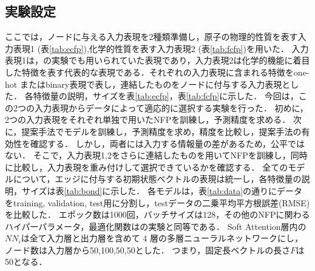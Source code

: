 \documentclass[twocolumn]{jarticle}
\begin{document}
\vspace{-6pt}
\subsection{実験設定}
ここでは，ノードに与える入力表現を2種類準備し，原子の物理的性質を表す入力表現1 (表\ref{tab:ecfp}),化学的性質を表す入力表現2 (表\ref{tab:fcfp})を用いた．
入力表現1は，\cite{NNFP}の実験でも用いられていた表現であり，入力表現2は化学的機能に着目した特徴を表す代表的な表現である．それぞれの入力表現に含まれる特徴をone-hot またはbinary表現で表し，連結したものをノードに付与する入力表現とした．
各特徴量の説明，サイズを表\ref{tab:ecfp}，表\ref{tab:fcfp}に示した．
今回は，この2つの入力表現からデータによって適応的に選択する実験を行った．
初めに，2つの入力表現をそれぞれ単独で用いたNFPを訓練し，予測精度を求める．
次に，提案手法でモデルを訓練し，予測精度を求め，精度を比較し，提案手法の有効性を確認する．
しかし，両者には入力する情報量の差があるため，公平ではない．
そこで，入力表現1,2をさらに連結したものを用いてNFPを訓練し，同時に比較し，入力表現を重み付けして選択できているかを確認する．
全てのモデルについて，エッジに付与する初期状態ベクトルの表現は統一し，各特徴量の説明，サイズは表\ref{tab:bond}に示した．
各モデルは，表\ref{tab:data}の通りにデータをtraining, validation, test用に分割し，testデータの二乗平均平方根誤差(RMSE)を比較した．
エポック数は1000回，バッチサイズは128，その他のNFPに関わるハイパーパラメータ，最適化関数は\cite{NNFP}の実験と同等である．
Soft Attention層内の$NN_i$は全て入力層と出力層を含めて 4 層の多層ニューラルネットワークにし，ノード数は入力層から50,100,50,50とした．
つまり，固定長ベクトルの長さ$F$は50となる．
\end{document}
